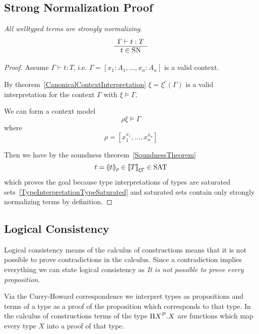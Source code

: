 \subsection{Strong Normalization Proof}


\begin{theorem}
    \label{StrongNormalizationProof}
    \emph{All welltyped terms are strongly normalizing}.
    $$
    \begin{array}{c} 
        \Gamma \vdash t : T
     \\ \hline 
        t \in \text{SN}
    \end{array}
    $$


    \begin{proof}
        Assume $\Gamma \vdash t : T$, i.e. $\Gamma = [x_1 : A_1, \ldots, x_n :
        A_n]$ is a valid context.

        By theorem~\ref{CanonicalContextInterpretation} $\xi = \xi^c(\Gamma)$ is
        a valid interpretation for the context $\Gamma$ with $\xi \vDash
        \Gamma$.

        We can form a context model
        $$
        \rho\xi \vDash \Gamma
        $$
        where
        $$
        \rho = [x_1^{x_1}, \ldots, x_n^{x_n}]
        $$

        Then we have by the soundness theorem~\ref{SoundnessTheorem}
        $$
        t = {(\!|t|\!)_{\rho}} \in {{{[\![}T {]\!]}}_{\xi\Gamma}} \in \text{SAT}
        $$
        which proves the goal because type interpretations of types are
        saturated sets~\ref{TypeInterpretationTypeSaturated} and saturated sets
        contain only strongly normalizing terms by definition.
    \end{proof}
\end{theorem}




\subsection{Logical Consistency}

Logical consistency means of the calculus of constructions means that it is not
possible to prove contradictions in the calculus. Since a contradiction implies
everything we can state logical consistency as \emph{It is not possible to prove
every proposition}.

Via the Curry-Howard correspondence we interpret types as propositions and terms
of a type as a proof of the proposition which corresponds to that type. In the
calculus of constructions terms of the type $\Pi X^{\cal P}. X$ are functions which
map every type $X$ into a proof of that type.

